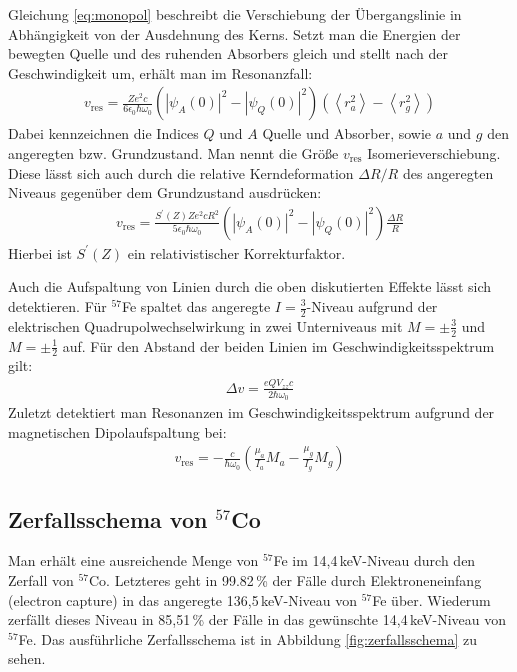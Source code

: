 	Gleichung \ref{eq:monopol} beschreibt die Verschiebung der Übergangslinie in Abhängigkeit von der Ausdehnung des Kerns. Setzt man die Energien der bewegten Quelle und des ruhenden Absorbers gleich und stellt nach der Geschwindigkeit um, erhält man im Resonanzfall:
	\begin{align}
		v_\text{res}=\frac{Ze^2c}{6\epsilon_0\hbar\omega_0}\left( \left| \psi_A(0)\right|^2 - \left| \psi_Q(0)\right|^2\right)  \left( \left\langle r_a^2\right\rangle - \left\langle r_g^2\right\rangle\right) 
	\end{align}
	Dabei kennzeichnen die Indices $Q$ und $A$ Quelle und Absorber, sowie $a$ und $g$ den angeregten bzw. Grundzustand. Man nennt die Größe $v_\text{res}$ Isomerieverschiebung. Diese lässt sich auch durch die relative Kerndeformation $\Delta R /R$ des angeregten Niveaus gegenüber dem Grundzustand ausdrücken:
	\begin{align}
		v_\text{res}=\frac{S^\prime(Z)Ze^2cR^2}{5\epsilon_0\hbar\omega_0}\left( \left| \psi_A(0)\right|^2 - \left| \psi_Q(0)\right|^2\right) \frac{\Delta R}{R}
	\end{align} 
	Hierbei ist $S^\prime(Z)$ ein relativistischer Korrekturfaktor. 
	
	Auch die Aufspaltung von Linien durch die oben diskutierten Effekte lässt sich detektieren. Für $^{57}$Fe spaltet das angeregte $I=\frac{3}{2}$-Niveau aufgrund der elektrischen Quadrupolwechselwirkung in zwei Unterniveaus mit $M=\pm \frac{3}{2}$ und $M=\pm \frac{1}{2}$ auf. Für den Abstand der beiden Linien im Geschwindigkeitsspektrum gilt:
	\begin{align}
		\Delta v= \frac{eQV_{zz}c}{2\hbar \omega_0}
	\end{align}
	Zuletzt detektiert man Resonanzen im Geschwindigkeitsspektrum aufgrund der magnetischen Dipolaufspaltung bei:
	\begin{align}
		v_\text{res}=-\frac{c}{\hbar \omega_0}\left(\frac{\mu_a}{I_a}M_a - \frac{\mu_g}{I_g}M_g \right) 
	\end{align}
	
	\subsection{Zerfallsschema von $^{57}$Co}
	
	Man erhält eine ausreichende Menge von $^{57}$Fe im 14,4\,keV-Niveau durch den Zerfall von $^{57}$Co. Letzteres geht in 99.82\,\% der Fälle durch Elektroneneinfang (electron capture) in das angeregte 136,5\,keV-Niveau von $^{57}$Fe über. Wiederum zerfällt dieses Niveau in 85,51\,\% der Fälle in das gewünschte 14,4\,keV-Niveau von $^{57}$Fe. Das ausführliche Zerfallsschema ist in Abbildung \ref{fig:zerfallsschema} zu sehen.
	
